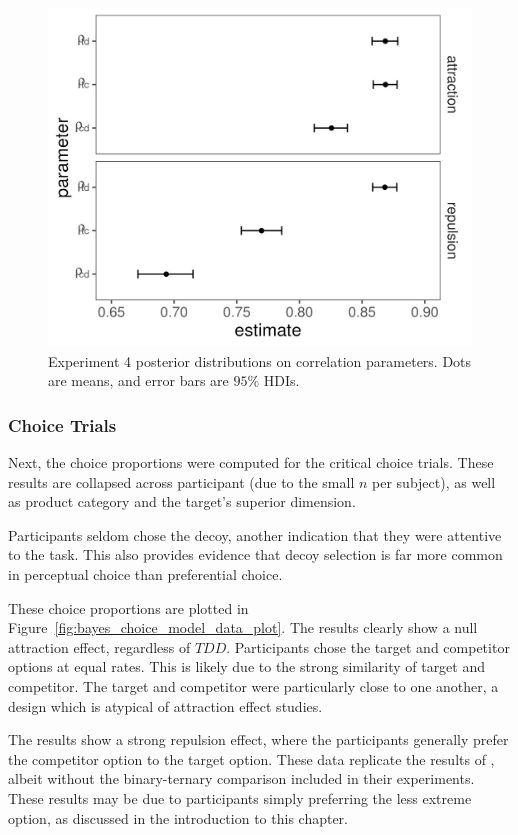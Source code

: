 \begin{figure}
    \includegraphics[scale=.5,width=120mm]{figures/price_omega_posteriors.jpeg}
    \caption{Experiment 4 posterior distributions on correlation parameters. Dots are means, and error bars are $95\%$ HDIs.}
    \label{fig:price_omega}
\end{figure}

\subsubsection{Choice Trials}

Next, the choice proportions were computed for the critical choice trials. These results are collapsed across participant (due to the small $n$ per subject), as well as product category and the target's superior dimension.

Participants seldom chose the decoy, another indication that they were attentive to the task. This also provides evidence that decoy selection is far more common in perceptual choice than preferential choice.

These choice proportions are plotted in Figure~\ref{fig:bayes_choice_model_data_plot}. The results clearly show a null attraction effect, regardless of $TDD$. Participants chose the target and competitor options at equal rates. This is likely due to the strong similarity of target and competitor. The target and competitor were particularly close to one another, a design which is atypical of attraction effect studies. 

The results show a strong repulsion effect, where the participants generally prefer the competitor option to the target option. These data replicate the results of \textcite{banerjeeFactorsThatPromote2024}, albeit without the binary-ternary comparison included in their experiments. These results may be due to participants simply preferring the less extreme option, as discussed in the introduction to this chapter.

